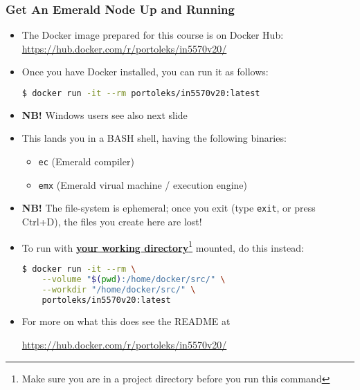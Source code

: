 \begin{frame}[fragile]

\frametitle{Get An Emerald Node Up and Running}

\begin{itemize}

\footnotesize

\item The Docker image prepared for this course is on Docker
Hub:\\[0.5em] \url{https://hub.docker.com/r/portoleks/in5570v20/}

\item Once you have Docker installed, you can run it as follows:

\vspace{-0.2in}

\begin{lstlisting}[language=bash]
$ docker run -it --rm portoleks/in5570v20:latest
\end{lstlisting}

\item \textbf{NB!} Windows users see also next slide

\item This lands you in a BASH shell, having the following binaries:

\begin{itemize}

\footnotesize

\item \texttt{ec} (Emerald compiler)

\item \texttt{emx} (Emerald virual machine / execution engine)

\end{itemize}

\item \textbf{NB!} The file-system is ephemeral; once you exit (type
\texttt{exit}, or press Ctrl+D), the files you create here are lost!

\item To run with \textbf{\underline{your working
directory}}\footnote{Make sure you are in a project directory before
you run this command} mounted, do this instead:

\vspace{-0.2in}

\begin{lstlisting}[language=bash]
$ docker run -it --rm \
    --volume "$(pwd):/home/docker/src/" \
    --workdir "/home/docker/src/" \
    portoleks/in5570v20:latest
\end{lstlisting}

\item For more on what this does see the README at

\url{https://hub.docker.com/r/portoleks/in5570v20/}

\end{itemize}

\end{frame}


